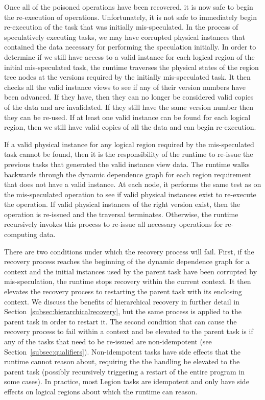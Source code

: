 Once all of the poisoned operations have been recovered, it
is now safe to begin the re-execution of operations. Unfortunately,
it is not safe to immediately begin re-execution of the task
that was initially mis-speculated. In the process of 
speculatively executing tasks, we may have corrupted physical
instances that contained the data necessary for performing
the speculation initially. In order to determine if we still
have access to a valid instance for each logical region 
of the initial mis-speculated task, the runtime traverses the 
physical states of the region tree nodes at the versions
required by the initially mis-speculated task. It then
checks all the valid instance views to see if any of their
version numbers have been advanced. If they have, then they
can no longer be considered valid copies of the data and
are invalidated. If they still have the same version number
then they can be re-used. If at least one valid instance
can be found for each logical region, then we still have
valid copies of all the data and can begin re-execution.

If a valid physical instance for any logical region 
required by the mis-speculated task cannot be found, then
it is the responsibility of the runtime to re-issue the
previous tasks that generated the valid instance view
data. The runtime walks backwards through the dynamic
dependence graph for each region requirement that does
not have a valid instance. At each node, it performs the
same test as on the mis-speculated operation to see if 
valid physical instances exist to re-execute the operation.
If valid physical instances of the right version exist,
then the operation is re-issued and the traversal terminates.
Otherwise, the runtime recursively invokes this process
to re-issue all necessary operations for re-computing data.

There are two conditions under which the recovery process
will fail. First, if the recovery process reaches the beginning
of the dynamic dependence graph for a context and the initial
instances used by the parent task have been corrupted by
mis-speculation, the runtime stops recovery within the 
current context. It then elevates the recovery process to restarting
the parent task with its enclosing context. We discuss the
benefits of hierarchical recovery in further detail in 
Section~\ref{subsec:hierarchicalrecovery}, but the same 
process is applied to the parent task in order to restart it.
The second condition that can cause the recovery process
to fail within a context and be elevated to the parent task
is if any of the tasks that need to be re-issued are 
non-idempotent (see Section~\ref{subsec:qualifiers}). 
Non-idempotent tasks have side effects that the runtime cannot
reason about, requiring the the handling be elevated to 
the parent task (possibly recursively triggering a restart
of the entire program in some cases). In practice, most 
Legion tasks are idempotent and only have side effects on
logical regions about which the runtime can reason.

